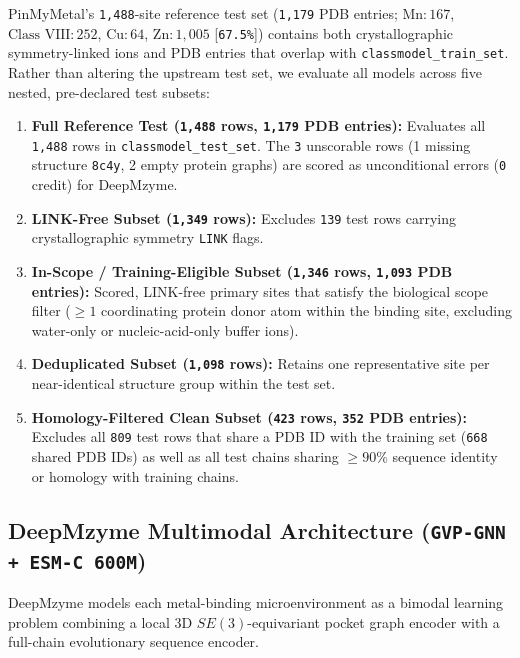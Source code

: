 \documentclass[10pt,a4paper,twocolumn]{article}
\begin{document}
PinMyMetal's \texttt{1,488}-site reference test set (\texttt{1,179} PDB entries; $\text{Mn}: 167$, $\text{Class VIII}: 252$, $\text{Cu}: 64$, $\text{Zn}: 1,005$ [\texttt{67.5\%}]) contains both crystallographic symmetry-linked ions and PDB entries that overlap with \texttt{classmodel\_train\_set}. Rather than altering the upstream test set, we evaluate all models across five nested, pre-declared test subsets:
\begin{enumerate}
  \item \textbf{Full Reference Test (\texttt{1,488} rows, \texttt{1,179} PDB entries):} Evaluates all \texttt{1,488} rows in \texttt{classmodel\_test\_set}. The \texttt{3} unscorable rows (1 missing structure \texttt{8c4y}, 2 empty protein graphs) are scored as unconditional errors (\texttt{0} credit) for DeepMzyme.
  \item \textbf{LINK-Free Subset (\texttt{1,349} rows):} Excludes \texttt{139} test rows carrying crystallographic symmetry \texttt{LINK} flags.
  \item \textbf{In-Scope / Training-Eligible Subset (\texttt{1,346} rows, \texttt{1,093} PDB entries):} Scored, LINK-free primary sites that satisfy the biological scope filter ($\ge 1$ coordinating protein donor atom within the binding site, excluding water-only or nucleic-acid-only buffer ions).
  \item \textbf{Deduplicated Subset (\texttt{1,098} rows):} Retains one representative site per near-identical structure group within the test set.
  \item \textbf{Homology-Filtered Clean Subset (\texttt{423} rows, \texttt{352} PDB entries):} Excludes all \texttt{809} test rows that share a PDB ID with the training set (\texttt{668} shared PDB IDs) as well as all test chains sharing $\ge 90\%$ sequence identity or homology with training chains.
\end{enumerate}

\subsection{DeepMzyme Multimodal Architecture (\texttt{GVP-GNN + ESM-C 600M})}

DeepMzyme models each metal-binding microenvironment as a bimodal learning problem combining a local 3D $SE(3)$-equivariant pocket graph encoder with a full-chain evolutionary sequence encoder.
\end{document}
